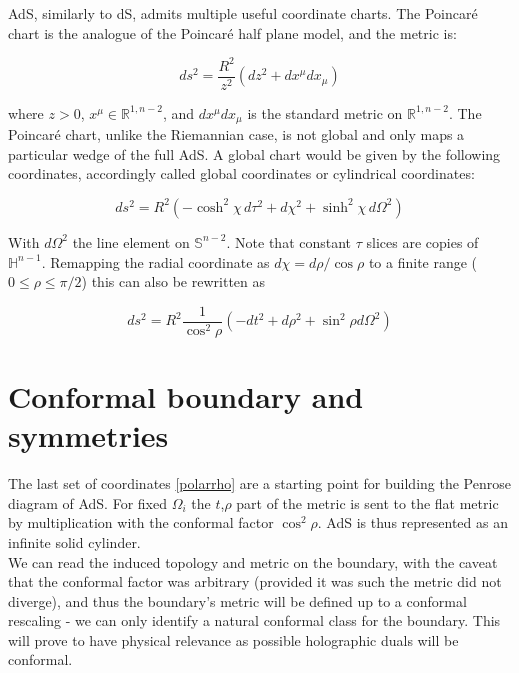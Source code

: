AdS, similarly to dS, admits multiple useful coordinate charts. The Poincaré chart is the analogue of the Poincaré half plane model, and the metric is:

\begin{equation} \label{poincarechart}
ds^2 = \frac{R^2}{z^2} \left(dz^2 + dx^\mu dx_\mu \right)
\end{equation}

where $z>0$, $x^\mu \in \mathbb{R}^{1,n-2}$, and $dx^\mu dx_\mu$ is the standard metric on $\mathbb{R}^{1,n-2}$. The Poincaré chart, unlike the Riemannian case, is not global and only maps a particular wedge of the full AdS. A global chart would be given by the following coordinates, accordingly called global coordinates or cylindrical coordinates:

\begin{equation}
ds^2 = R^2 \left( -\cosh^2 \chi \, d\tau^2 + d\chi^2 + \sinh^2 \chi \, d\Omega^2 \right)
\end{equation}

With $d\Omega^2$ the line element on $\mathbb{S}^{n-2}$. Note that constant $\tau$ slices are copies of $\mathbb{H}^{n-1}$. Remapping the radial coordinate as $d\chi = d\rho/\cos\rho$ to a finite range ($0\le \rho \le \pi/2$) this can also be rewritten as

\begin{equation} \label{polarrho}
	ds^2 = R^2 \frac{1}{\cos^{2} \rho} \left( - dt^2 + d\rho^2 + \sin^2 \rho d\Omega^2  \right)
\end{equation}

\section{Conformal boundary and symmetries}

The last set of coordinates \ref{polarrho} are a starting point for building the Penrose diagram of AdS. For fixed $\Omega_i$ the $t$,$\rho$ part of the metric is sent to the flat metric by multiplication with the conformal factor $\cos^2 \rho$. AdS is thus represented as an infinite solid cylinder.\\

We can read the induced topology and metric on the boundary, with the caveat that the conformal factor was arbitrary (provided it was such the metric did not diverge), and thus the boundary's metric will be defined up to a conformal rescaling - we can only identify a natural conformal class for the boundary. This will prove to have physical relevance as possible holographic duals will be conformal.\\

